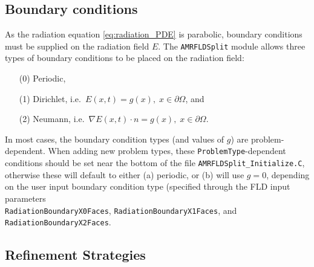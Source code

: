 \documentclass[letterpaper,10pt]{article}
\renewcommand{\(}{\left(}
\renewcommand{\)}{\right)}
\begin{document}
\subsection{Boundary conditions}
\label{sec:AMRFLDSplit_boundary_conditions}

As the radiation equation \eqref{eq:radiation_PDE} is parabolic,
boundary conditions must be supplied on the radiation field $E$.  The
{\tt AMRFLDSplit} module allows three types of boundary conditions to
be placed on the radiation field:
\begin{itemize}
\item[(0)] Periodic,
\item[(1)] Dirichlet, i.e.~$E(x,t) = g(x), \; x\in\partial\Omega$, and
\item[(2)] Neumann, i.e.~$\nabla E(x,t)\cdot n = g(x), \; x\in\partial\Omega$.
\end{itemize}
In most cases, the boundary condition types (and values of $g$) are
problem-dependent.  When adding new problem types, these 
{\tt ProblemType}-dependent conditions should be set near the bottom
of the file {\tt AMRFLDSplit\_Initialize.C}, otherwise these will
default to either (a) periodic, or (b) will use $g=0$, depending on
the user input boundary condition type (specified through the FLD
input parameters \\
{\tt RadiationBoundaryX0Faces}, {\tt RadiationBoundaryX1Faces}, and
{\tt RadiationBoundaryX2Faces}. 




\subsection{Refinement Strategies}
\label{sec:AMRFLDSplit_refinement}
\end{document}
